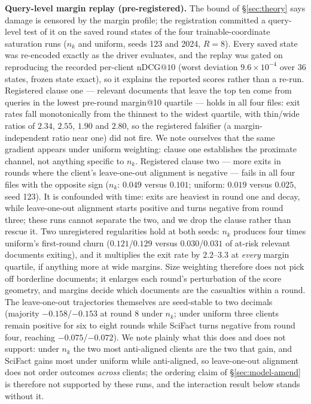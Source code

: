 \documentclass[sigconf,anonymous,review]{acmart}
\makeatletter
\newcommand{\ndcg}{\mathrm{nDCG@10}}
\makeatother
\begin{document}
\textbf{Query-level margin replay (pre-registered).} The bound of \S\ref{sec:theory} says damage is censored by the margin profile; the registration committed a query-level test of it on the saved round states of the four trainable-coordinate saturation runs ($n_k$ and uniform, seeds 123 and 2024, $R{=}8$). Every saved state was re-encoded exactly as the driver evaluates, and the replay was gated on reproducing the recorded per-client $\ndcg$ (worst deviation $9.6\times10^{-4}$ over 36 states, frozen state exact), so it explains the reported scores rather than a re-run. Registered clause one --- relevant documents that leave the top ten come from queries in the lowest pre-round margin@10 quartile --- holds in all four files: exit rates fall monotonically from the thinnest to the widest quartile, with thin/wide ratios of $2.34$, $2.55$, $1.90$ and $2.80$, so the registered falsifier (a margin-independent ratio near one) did not fire. We note ourselves that the same gradient appears under uniform weighting: clause one establishes the proximate channel, not anything specific to $n_k$. Registered clause two --- more exits in rounds where the client's leave-one-out alignment is negative --- fails in all four files with the opposite sign ($n_k$: $0.049$ versus $0.101$; uniform: $0.019$ versus $0.025$, seed 123). It is confounded with time: exits are heaviest in round one and decay, while leave-one-out alignment starts positive and turns negative from round three; these runs cannot separate the two, and we drop the clause rather than rescue it. Two unregistered regularities hold at both seeds: $n_k$ produces four times uniform's first-round churn ($0.121$/$0.129$ versus $0.030$/$0.031$ of at-risk relevant documents exiting), and it multiplies the exit rate by $2.2$--$3.3$ at \emph{every} margin quartile, if anything more at wide margins. Size weighting therefore does not pick off borderline documents; it enlarges each round's perturbation of the score geometry, and margins decide which documents are the casualties within a round. The leave-one-out trajectories themselves are seed-stable to two decimals (majority $-0.158$/$-0.153$ at round 8 under $n_k$; under uniform three clients remain positive for six to eight rounds while SciFact turns negative from round four, reaching $-0.075$/$-0.072$). We note plainly what this does and does not support: under $n_k$ the two most anti-aligned clients are the two that gain, and SciFact gains most under uniform while anti-aligned, so leave-one-out alignment does not order outcomes \emph{across} clients; the ordering claim of \S\ref{sec:model-amend} is therefore not supported by these runs, and the interaction result below stands without it.
\end{document}
